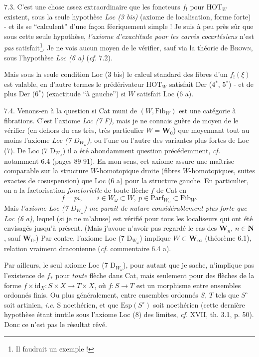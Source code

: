 \documentclass[11pt]{article}
\newcommand{\printedpage}[1]{\marginpar{\footnotesize p.~#1}}
\newcommand{\msp}[1]{\marginpar{\footnotesize [#1]}}
\begin{document}
7.3. C'est une chose assez extraordinaire que les foncteurs $f_!$ pour $\mathrm{HOT}_W$ existent, sous la seule hypothèse \textit{Loc (3 bis)} (axiome de localisation, forme forte) - et ils se “calculent” d'une façon féeriquement simple ! Je suis à peu près sûr que sous cette seule hypothèse, \textit{l'axiome d'exactitude pour les carrés cocartésiens} n'est \textit{pas} satisfait\footnote[47]{Il faudrait un exemple !}. Je ne vois aucun moyen de le vérifier, sauf via la théorie de \textsc{Brown}, sous l'hypothèse \textit{Loc (6 a)} (\textit{cf.} 7.2).

Mais sous la seule condition Loc (3 bis) le calcul standard des fibres d'un $f_!(\xi)$
\printedpage{50}
\msp{page 101}
est valable, en d'autre termes le prédérivateur $\mathrm{HOT}_W$ satisfait Der (4$^*$, 5$^*$) - et de plus Der (6$^*$) (exactitude “à gauche”) si $W$ satisfait Loc (6 a). %

7.4. Venons-en à la question si Cat muni de $(W,\mathrm{Fib}_W)$ est une catégorie à fibrations. C'est l'axiome \textit{Loc (7 F),} mais je ne connais guère de moyen de le vérifier (en dehors du cas très, très particulier $W = \mathbf{W}_0$) que moyennant tout au moins l'axiome \textit{Loc (7 $D_{W_\omega}$),} ou l'une ou l'autre des variantes plus fortes de Loc (7). De Loc (7 $\mathrm{D}_{W_\omega}$) il a été abondamment question précédemment, \textit{cf.} notamment 6.4 (pages 89-91). En mon sens, cet axiome assure une maîtrise comparable sur la structure $W$-homotopique droite (fibres $W$-homotopiques, suites exactes de cosuspension) que Loc (6 a) pour la
\msp{page 102}
structure gauche. En particulier, on a la factorisation \textit{fonctorielle} de toute flèche $f$ de Cat en
\[
f = pi, \qquad i \in W_\omega \subset W,\ p \in \mathrm{Parf}_{W_\omega} \subset \mathrm{Fib}_W .
\]
Mais \textit{l'axiome Loc (7 $D_{W_\omega}$) me paraît de nature considérablement plus forte que Loc (6 a),} lequel (si je ne m'abuse) est vérifié pour tous les localiseurs qui ont été envisagés jusqu'à présent. (Mais j'avoue n'avoir pas regardé le cas des $\mathbf{W}_n$, $n \in \mathbf{N}$, sauf $\mathbf{W}_0$.) Par contre, l'axiome Loc (7 $\mathrm{D}_{W_\omega}$) implique $W \subset \mathbf{W}_\infty$ (théorème 6.1), relation vraiment draconienne (\textit{cf.} commentaire 6.4 a).

Par ailleurs, le seul axiome Loc (7 $\mathrm{D}_{W_\omega}$), pour autant que je sache, n'implique pas l'existence de $f_*$ pour \textit{toute} flèche dans Cat, mais seulement pour des
\msp{page 103}
flèches de la forme $f \times \mathrm{id}_X : S \times X \longrightarrow T \times X$, où $f : S \longrightarrow T$ est un morphisme entre ensembles ordonnés finis. Ou plus généralement, entre ensembles ordonnés $S$, $T$ tels que $S^\circ$ soit artinien, \textit{i.e.} $\mathrm{S}$ noethérien, et que $\mathrm{Esp}(S^\circ)$ soit noethérien (cette dernière hypothèse étant inutile sous l'axiome Loc (8) des limites, \textit{cf.} XVII, th. 3.1, p. 50). Donc ce n'est pas le résultat rêvé.
\end{document}
